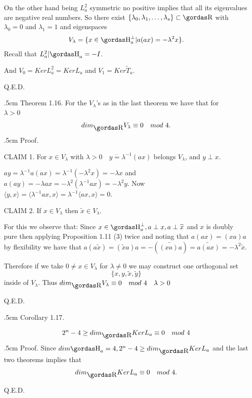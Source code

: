 On the other hand being $L^{2}_{a}$ symmetric no positive implies that all its 
eigenvalues are negative real numbers. So there exist 
$\{\lambda_{0},\lambda_{1},\ldots,\lambda_{s}\}\subset \erre$ with 
$\lambda_{0}=0$ and $\lambda_{1}=1$ and eigenspaces
$$V_{\lambda}=\{x\in \ache^{\perp}_{a}|a(ax)=-\lambda^{2}x\}.$$
Recall that $L^{2}_{a}|\ache_{a}=-I$.
\par 
And $V_{0}= Ker L^{2}_{a}= Ker L_{a}$ and $V_{1}= Ker \widetilde{T}_{a}$.
\begin{flushright}
Q.E.D.
\end{flushright}
\vglue.5cm
\noindent
{\bsbf Theorem 1.16.} For the $V_{\lambda}$'s as in the last theorem we have
that for \\ $\lambda>0$%
$$ dim_{\erre}V_{\lambda}\equiv 0\quad mod\,\, 4.$$
\vglue.5cm
\noindent
{\bsbf Proof.} 
\par 
{\bsbf CLAIM 1.} For $x\in V_{\lambda}$ with 
$\lambda >0\quad y\stackrel{\cdot\cdot}{=}\lambda^{-1}(ax)$  
belongs $V_{\lambda}$, and $y\perp x$.
\par 
$ay=\lambda^{-1} a(ax)=\lambda^{-1}(-\lambda^{2}x)=-\lambda x$ and
$a(ay)=-\lambda ax=-\lambda^{2}(\lambda^{-1} ax)=-\lambda^{2}y$.
Now $\langle y,x\rangle=\langle\lambda^{-1} ax,x\rangle=\lambda^{-1}\langle 
ax,x\rangle=0$.
\par 
{\bsbf CLAIM 2.} If $x\in V_{\lambda}$ then $\widetilde{x}\in V_{\lambda}$.
\par 
For this we observe that: Since 
$x\in \ache^{\perp}_{a}, a\perp x, a\perp\widetilde{x}$ and $x$ is doubly pure then 
applying Proposition 1.11 (3) twice and noting that $a(ax)=(xa)a$ 
by flexibility we have
that 
$a(a\widetilde{x})=(\widetilde{x}a)a=-(\widetilde{(xa)a})=\widetilde{a(ax)}=
-\lambda^{2}\widetilde{x}$.
\par 
Therefore if we take $0\neq x\in V_{\lambda}$ for $\lambda\neq 0$ we may construct 
one orthogonal set
$$\{x,y,\widetilde{x},\widetilde{y}\}$$
inside of $V_{\lambda}$. Thus $dim_{\erre}V_{\lambda}\equiv 0\quad
mod\,\, 4 \quad \lambda >0$
\begin{flushright}
Q.E.D.
\end{flushright}
\vglue.5cm
\noindent
{\bsbf Corollary 1.17.}
\par 
$$2^{n}-4\ge dim_{\erre} Ker L_{a}\equiv 0\quad mod\,\, 4$$
\vglue.5cm
\noindent
{\bsbf Proof.} Since $dim \ache_{a}=4, 2^{n}-4\ge  dim_{\erre}Ker L_{a}$ and
the last two theorems implies that
$$dim_{\erre}Ker L_{a}\equiv 0\quad mod\,\, 4.$$
\begin{flushright}
Q.E.D.
\end{flushright}
